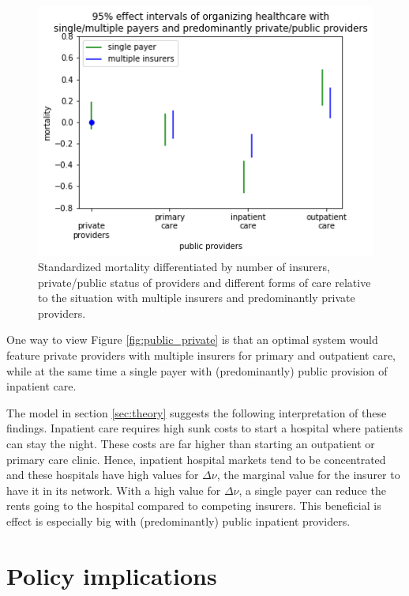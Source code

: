 \documentclass[12pt,english,a4paper]{article}
\begin{document}
\begin{figure}[htbp]
\centering
\includegraphics[width=.9\linewidth]{./figures/single_multiple_public_private.png}
\caption{\label{fig:org5b8d540}Standardized mortality differentiated by number of insurers, private/public status of providers and different forms of care relative to the situation with multiple insurers and predominantly private providers.}
\end{figure}

One way to view Figure \ref{fig:public_private} is that an optimal system would feature private providers with multiple insurers for primary and outpatient care, while at  the same time a single payer with (predominantly) public provision of inpatient care.

The model in section \ref{sec:theory} suggests the following interpretation of these findings. Inpatient care requires high sunk costs to start a hospital where patients can stay the night. These costs are far higher than starting an outpatient or primary care clinic. Hence, inpatient hospital markets tend to be concentrated and these hospitals have high values for \(\Delta \nu\), the marginal value for the insurer to have it in its network. With a high value for \(\Delta \nu\), a single payer can reduce the rents going to the hospital compared to competing insurers. This beneficial is effect is especially big with (predominantly) public inpatient providers.


\section{Policy implications}
\label{sec:orgfe90a06}
\end{document}
